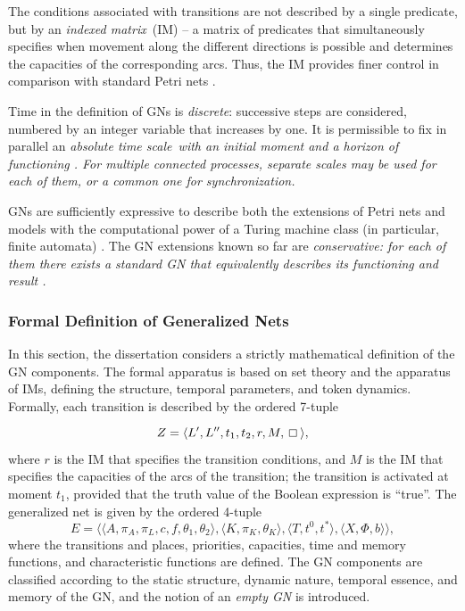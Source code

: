 The conditions associated with transitions are not described by a single predicate, but by an \textit{indexed matrix}\ (IM) -- a matrix of predicates that simultaneously specifies when movement along the different directions is possible and determines the capacities of the corresponding arcs. Thus, the IM provides finer control in comparison with standard Petri nets \cite{DIS-Z1}.

Time in the definition of GNs is \textit{discrete}: successive steps are considered, numbered by an integer variable that increases by one. It is permissible to fix in parallel an \it absolute time scale\rm\ with an initial moment and a horizon of functioning \cite{DIS-Z1}. For multiple connected processes, separate scales may be used for each of them, or a common one for synchronization.

GNs are sufficiently expressive to describe both the extensions of Petri nets and models with the computational power of a Turing machine class (in particular, finite automata) \cite{DIS-Z1}. The GN extensions known so far are \it conservative\rm: for each of them there exists a standard GN that equivalently describes its functioning and result \cite{DIS-Z1, DIS-BAM}.

\subsubsection{Formal Definition of Generalized Nets}

\hspace*{2.5em}In this section, the dissertation considers a strictly mathematical definition of the GN components. The formal apparatus is based on set theory and the apparatus of IMs, defining the structure, temporal parameters, and token dynamics. Formally, each transition is described by the ordered 7-tuple
$$ Z = \langle L', L'', t_{1}, t_{2}, r, M, \kv \rangle, $$
where $r$ is the IM that specifies the transition conditions, and $M$ is the IM that specifies the capacities of the arcs of the transition; the transition is activated at moment $t_1$, provided that the truth value of the Boolean expression is ``true''. The generalized net is given by the ordered 4-tuple
$$ E = \langle \langle A, \pi_{A}, \pi_{L}, c, f, \theta_{1}, \theta_{2} \rangle,
\langle K, \pi_{K}, \theta_{K} \rangle, \langle T, t^{0}, t^{*} \rangle,
\langle X, \Phi, b \rangle \rangle, $$
where the transitions and places, priorities, capacities, time and memory functions, and characteristic functions are defined. The GN components are classified according to the static structure, dynamic nature, temporal essence, and memory of the GN, and the notion of an \textit{empty GN} is introduced.

